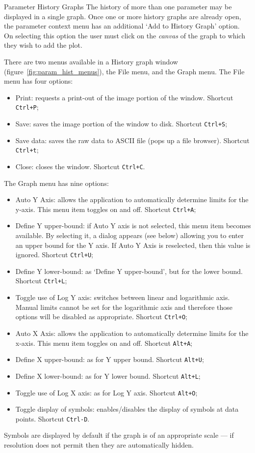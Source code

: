 \documentclass[a4paper,twoside]{article}
\begin{document}
\begin{section}{Parameter History Graphs}
The history of more than one parameter may be displayed in a single
graph.  Once one or more history graphs are already open, the
parameter context menu has an additional `Add to History Graph'
option. On selecting this option the user must click on the {\em
  canvas} of the graph to which they wish to add the plot.

There are two menus available in a History graph window
(figure~\ref{fig:param_hist_menus}), the File menu, and the Graph
menu. The File menu has four options:
\begin{itemize}
\item Print: requests a print-out of the image portion of the window.
  Shortcut \texttt{Ctrl+P};
\item Save: saves the image portion of the window to disk. Shortcut
  \texttt{Ctrl+S};
\item Save data: saves the raw data to ASCII file (pops up a file
  browser).  Shortcut \texttt{Ctrl+t};
\item Close: closes the window. Shortcut \texttt{Ctrl+C}.
\end{itemize}
The Graph menu has nine options:
\begin{itemize}
\item Auto Y Axis: allows the application to automatically determine
  limits for the y-axis. This menu item toggles on and off.  Shortcut
  \texttt{Ctrl+A};
\item Define Y upper-bound: if Auto Y axis is not selected, this menu
  item becomes available. By selecting it, a dialog appears (see
  below) allowing you to enter an upper bound for the Y axis.  If Auto
  Y Axis is reselected, then this value is ignored.  Shortcut
  \texttt{Ctrl+U};
\item Define Y lower-bound: as `Define Y upper-bound', but for the
  lower bound. Shortcut \texttt{Ctrl+L};
\item Toggle use of Log Y axis: switches between linear and
  logarithmic axis.  Manual limits cannot be set for the logarithmic
  axis and therefore those options will be disabled as appropriate.
  Shortcut \texttt{Ctrl+O};
\item Auto X Axis: allows the application to automatically determine
  limits for the x-axis. This menu item toggles on and off. Shortcut
  \texttt{Alt+A};
\item Define X upper-bound: as for Y upper bound. Shortcut
  \texttt{Alt+U};
\item Define X lower-bound: as for Y lower bound. Shortcut
  \texttt{Alt+L};
\item Toggle use of Log X axis: as for Log Y axis. Shortcut
  \texttt{Alt+O};
\item Toggle display of symbols: enables/disables the display of
  symbols at data points. Shortcut \texttt{Ctrl-D}.
\end{itemize}
Symbols are displayed by default if the graph is of an appropriate
scale --- if resolution does not permit then they are automatically
hidden.


\end{section}
\end{document}
